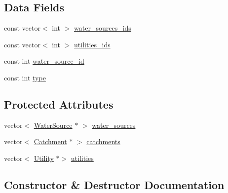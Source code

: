 \subsection*{Data Fields}
\begin{DoxyCompactItemize}
\item 
const vector$<$ int $>$ \mbox{\hyperlink{classMinEnvironFlowControl_a1544571a77557853d0cc8189bd29f4b3_a1544571a77557853d0cc8189bd29f4b3}{water\+\_\+sources\+\_\+ids}}
\item 
const vector$<$ int $>$ \mbox{\hyperlink{classMinEnvironFlowControl_ae5acc488f8a0b8aaf7a85cfc8a25bbf9_ae5acc488f8a0b8aaf7a85cfc8a25bbf9}{utilities\+\_\+ids}}
\item 
const int \mbox{\hyperlink{classMinEnvironFlowControl_a571d4d56086eb752aebb20b2d85fa8e7_a571d4d56086eb752aebb20b2d85fa8e7}{water\+\_\+source\+\_\+id}}
\item 
const int \mbox{\hyperlink{classMinEnvironFlowControl_a1a10a6b5720c934eef698cd72c9d883c_a1a10a6b5720c934eef698cd72c9d883c}{type}}
\end{DoxyCompactItemize}
\subsection*{Protected Attributes}
\begin{DoxyCompactItemize}
\item 
vector$<$ \mbox{\hyperlink{classWaterSource}{Water\+Source}} $\ast$ $>$ \mbox{\hyperlink{classMinEnvironFlowControl_ac5be281d802ad1de433bed588bb13cfe_ac5be281d802ad1de433bed588bb13cfe}{water\+\_\+sources}}
\item 
vector$<$ \mbox{\hyperlink{classCatchment}{Catchment}} $\ast$ $>$ \mbox{\hyperlink{classMinEnvironFlowControl_a3d55c77bc8ba49b14b20eb494868b3ce_a3d55c77bc8ba49b14b20eb494868b3ce}{catchments}}
\item 
vector$<$ \mbox{\hyperlink{classUtility}{Utility}} $\ast$$>$ \mbox{\hyperlink{classMinEnvironFlowControl_a6c43408d05901838fa567c8e23a37009_a6c43408d05901838fa567c8e23a37009}{utilities}}
\end{DoxyCompactItemize}


\subsection{Constructor \& Destructor Documentation}
\mbox{\label{classMinEnvironFlowControl_a5b40c3f8da8c63513edb30804bf2ca01_a5b40c3f8da8c63513edb30804bf2ca01}} 
